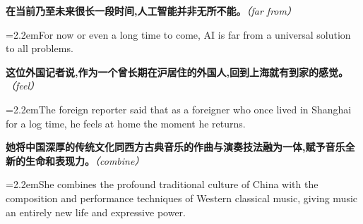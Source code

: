 \documentclass[11pt,a4paper]{article}
\newcommand{\num}[1]{\makebox[1.9em][r]{#1.}\hspace{0.3em}}
\newcommand{\prompt}[1]{\emph{\textcolor{tipblue}{\small（#1）}}}
\begin{document}
\begin{minipage}{\linewidth}

\num{40}\textbf{在当前乃至未来很长一段时间,人工智能并非无所不能。}\prompt{far from}

\vspace{0.15em}

\noindent\hangindent=2.2em\hspace{2.2em}For now or even a long time to come, AI is far from a universal solution to all problems.

\end{minipage}

\begin{minipage}{\linewidth}

\num{41}\textbf{这位外国记者说,作为一个曾长期在沪居住的外国人,回到上海就有到家的感觉。}\prompt{feel}

\vspace{0.15em}

\noindent\hangindent=2.2em\hspace{2.2em}The foreign reporter said that as a foreigner who once lived in Shanghai for a log time, he feels at home the moment he returns.

\end{minipage}

\begin{minipage}{\linewidth}

\num{42}\textbf{她将中国深厚的传统文化同西方古典音乐的作曲与演奏技法融为一体,赋予音乐全新的生命和表现力。}\prompt{combine}

\vspace{0.15em}

\noindent\hangindent=2.2em\hspace{2.2em}She combines the profound traditional culture of China with the composition and performance techniques of Western classical music, giving music an entirely new life and expressive power.

\end{minipage}
\end{document}
